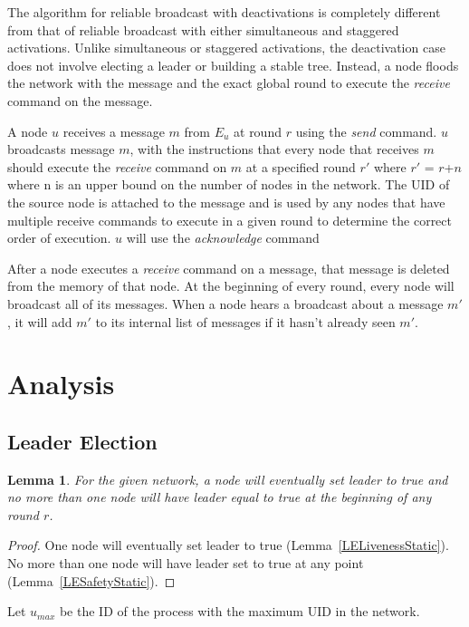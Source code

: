 \documentclass[english]{article}
\newtheorem{lemma}[theorem]{Lemma}
\begin{document}
The algorithm for reliable broadcast with deactivations is completely different from that of reliable broadcast with either simultaneous and staggered activations. Unlike simultaneous or staggered activations, the deactivation case does not involve electing a leader or building a stable tree. Instead, a node floods the network with the message and the exact global round to execute the \textit{receive} command on the message.

A node $u$ receives a message $m$ from $E_u$ at round $r$ using the \textit{send} command. $u$ broadcasts message $m$, with the instructions that every node that receives $m$ should execute the \textit{receive} command on $m$ at a specified round $r'$ where $r'$ = $r$+$n$ where n is an upper bound on the number of nodes in the network. The UID of the source node is attached to the message and is used by any nodes that have multiple receive commands to execute in a given round to determine the correct order of execution. $u$ will use the \textit{acknowledge} command

After a node executes a \textit{receive} command on a message, that message is deleted from the memory of that node. At the beginning of every round, every node will broadcast all of its messages. When a node hears a broadcast about a message $m'$, it will add $m'$ to its internal list of messages if it hasn't already seen $m'$.


\section{Analysis}

\subsection{Leader Election}

\begin{lemma}
\label{LeaderElectionStatic}
For the given network, a node will eventually set leader to true and no more than one node will have leader equal to true at the beginning of any round $r$. 
\end{lemma}
\begin{proof}
One node will eventually set leader to true (Lemma~\ref{LELivenessStatic}).
No more than one node will have leader set to true at any point (Lemma~\ref{LESafetyStatic}).
\end{proof}

\begin{definition}
Let $u_{max}$ be the ID of the process with the maximum UID in the network. 
\end{definition}
\end{document}
